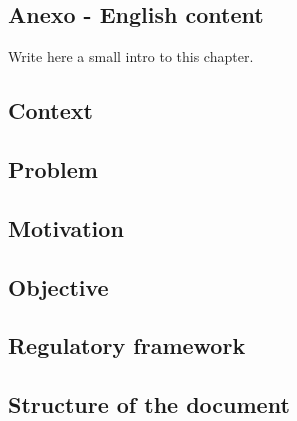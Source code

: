 \begin{otherlanguage}{english}
\setlength{\headheight}{15.10785pt}

\chapter{Anexo - English content}
\label{chap:09annexes}

Write here a small intro to this chapter.

\section{Context}

\section{Problem}

\section{Motivation}

\section{Objective}

\section{Regulatory framework}

\section{Structure of the document}

\end{otherlanguage}